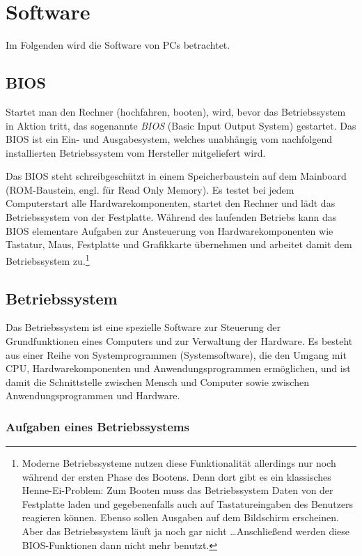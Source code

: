 \section{Software}

Im Folgenden wird die Software von PCs betrachtet.

\subsection{BIOS}

Startet man den Rechner (\glqq hochfahren\grqq , booten), wird, bevor das
Betriebssystem in Aktion tritt, das sogenannte \emph{BIOS} (Basic Input Output
System) gestartet. Das BIOS ist ein Ein- und Ausgabesystem, welches unabhängig
vom nachfolgend installierten Betriebssystem vom Hersteller mitgeliefert wird.

Das BIOS steht schreibgeschützt in einem Speicherbaustein auf dem Mainboard
(ROM-Baustein, engl. für Read Only Memory). Es testet bei jedem Computerstart
alle Hardwarekomponenten, startet den Rechner und lädt das Betriebssystem von
der Festplatte. Während des laufenden Betriebs kann das BIOS elementare
Aufgaben zur Ansteuerung von Hardwarekomponenten wie Tastatur, Maus, Festplatte
und Grafikkarte übernehmen und arbeitet damit dem Betriebssystem
zu.\footnote{Moderne Betriebssysteme nutzen diese Funktionalität allerdings nur
noch während der ersten Phase des Bootens. Denn dort gibt es ein
klassisches Henne-Ei-Problem: Zum Booten muss das Betriebssystem
Daten von der Festplatte laden und gegebenenfalls auch auf
Tastatureingaben des Benutzers reagieren können. Ebenso sollen
Ausgaben auf dem Bildschirm erscheinen. Aber das Betriebssystem
läuft ja noch gar nicht \ldots Anschließend werden diese BIOS-Funktionen dann
nicht mehr benutzt.}

\subsection{Betriebssystem}

Das Betriebssystem ist eine spezielle Software zur Steuerung der
Grundfunktionen eines Computers und zur Verwaltung der Hardware. Es besteht aus
einer Reihe von Systemprogrammen (Systemsoftware), die den Umgang mit CPU,
Hardwarekomponenten und Anwendungsprogrammen ermöglichen, und ist damit die
Schnittstelle zwischen Mensch und Computer sowie zwischen Anwendungsprogrammen
und Hardware.

\subsubsection{Aufgaben eines Betriebssystems}

